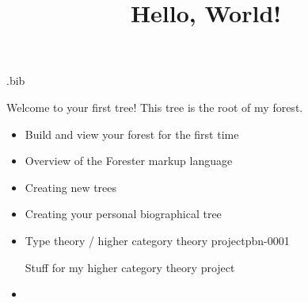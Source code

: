 \documentclass[oneside,a4paper]{book}%
\title{Hello, World!}\author{}
\theoremstyle{definition}%
\begin{document}
\begin{filecontents*}[overwrite]{\jobname.bib}

\end{filecontents*}
\frontmatter\maketitle\tableofcontents\mainmatter\par{}
  Welcome to your first tree! This tree is the root of my forest.
  \begin{itemize}\item{}Build and view your forest for the first time
    \item{}Overview of the Forester markup language
    \item{}Creating new trees
    \item{}Creating your personal biographical tree
    \item{}Type theory / higher category theory projectpbn-0001\par{}Stuff for my higher category theory project
    \item{}\end{itemize}\backmatter\nocite{*}
\end{document}
